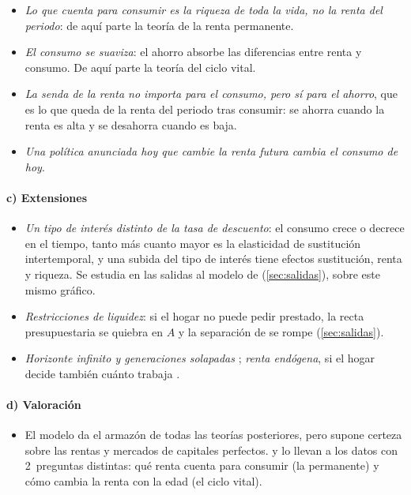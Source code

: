 \documentclass[11pt]{article}
\begin{document}
\begin{itemize}
\item \emph{Lo que cuenta para consumir es la riqueza de toda la vida, no la renta del periodo}: de aquí parte la teoría de la renta permanente.
\item \emph{El consumo se suaviza}: el ahorro absorbe las diferencias entre renta y consumo. De aquí parte la teoría del ciclo vital.
\item \emph{La senda de la renta no importa para el consumo, pero sí para el ahorro}, que es lo que queda de la renta del periodo tras consumir: se ahorra cuando la renta es alta y se desahorra cuando es baja.
\item \emph{Una política anunciada hoy que cambie la renta futura cambia el consumo de hoy}.
\end{itemize}

\paragraph{c) Extensiones}

\begin{itemize}
\item \emph{Un tipo de interés distinto de la tasa de descuento}: el consumo crece o decrece en el tiempo, tanto más cuanto mayor es la elasticidad de sustitución intertemporal, y una subida del tipo de interés tiene efectos sustitución, renta y riqueza. Se estudia en las salidas al modelo de  (\ref{sec:salidas}), sobre este mismo gráfico.
\item \emph{Restricciones de liquidez}: si el hogar no puede pedir prestado, la recta presupuestaria se quiebra en $A$ y la separación de  se rompe (\ref{sec:salidas}).
\item \emph{Horizonte infinito y generaciones solapadas} ; \emph{renta endógena}, si el hogar decide también cuánto trabaja .
\end{itemize}

\paragraph{d) Valoración}

\begin{itemize}
\item El modelo da el armazón de todas las teorías posteriores, pero supone certeza sobre las rentas y mercados de capitales perfectos.  y  lo llevan a los datos con 2~preguntas distintas: qué renta cuenta para consumir (la permanente) y cómo cambia la renta con la edad (el ciclo vital).
\end{itemize}
\end{document}
